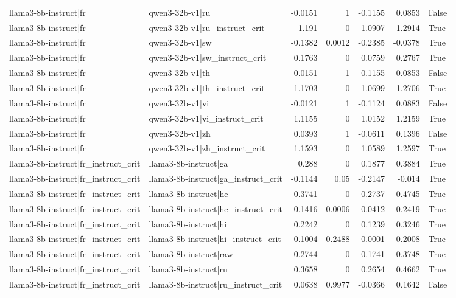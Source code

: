 \begin{table}
\begin{tabular}{l l r r r r l}
llama3-8b-instruct|fr & qwen3-32b-v1|ru & -0.0151 & 1 & -0.1155 & 0.0853 & False \\
llama3-8b-instruct|fr & qwen3-32b-v1|ru_instruct_crit & 1.191 & 0 & 1.0907 & 1.2914 & True \\
llama3-8b-instruct|fr & qwen3-32b-v1|sw & -0.1382 & 0.0012 & -0.2385 & -0.0378 & True \\
llama3-8b-instruct|fr & qwen3-32b-v1|sw_instruct_crit & 0.1763 & 0 & 0.0759 & 0.2767 & True \\
llama3-8b-instruct|fr & qwen3-32b-v1|th & -0.0151 & 1 & -0.1155 & 0.0853 & False \\
llama3-8b-instruct|fr & qwen3-32b-v1|th_instruct_crit & 1.1703 & 0 & 1.0699 & 1.2706 & True \\
llama3-8b-instruct|fr & qwen3-32b-v1|vi & -0.0121 & 1 & -0.1124 & 0.0883 & False \\
llama3-8b-instruct|fr & qwen3-32b-v1|vi_instruct_crit & 1.1155 & 0 & 1.0152 & 1.2159 & True \\
llama3-8b-instruct|fr & qwen3-32b-v1|zh & 0.0393 & 1 & -0.0611 & 0.1396 & False \\
llama3-8b-instruct|fr & qwen3-32b-v1|zh_instruct_crit & 1.1593 & 0 & 1.0589 & 1.2597 & True \\
llama3-8b-instruct|fr_instruct_crit & llama3-8b-instruct|ga & 0.288 & 0 & 0.1877 & 0.3884 & True \\
llama3-8b-instruct|fr_instruct_crit & llama3-8b-instruct|ga_instruct_crit & -0.1144 & 0.05 & -0.2147 & -0.014 & True \\
llama3-8b-instruct|fr_instruct_crit & llama3-8b-instruct|he & 0.3741 & 0 & 0.2737 & 0.4745 & True \\
llama3-8b-instruct|fr_instruct_crit & llama3-8b-instruct|he_instruct_crit & 0.1416 & 0.0006 & 0.0412 & 0.2419 & True \\
llama3-8b-instruct|fr_instruct_crit & llama3-8b-instruct|hi & 0.2242 & 0 & 0.1239 & 0.3246 & True \\
llama3-8b-instruct|fr_instruct_crit & llama3-8b-instruct|hi_instruct_crit & 0.1004 & 0.2488 & 0.0001 & 0.2008 & True \\
llama3-8b-instruct|fr_instruct_crit & llama3-8b-instruct|raw & 0.2744 & 0 & 0.1741 & 0.3748 & True \\
llama3-8b-instruct|fr_instruct_crit & llama3-8b-instruct|ru & 0.3658 & 0 & 0.2654 & 0.4662 & True \\
llama3-8b-instruct|fr_instruct_crit & llama3-8b-instruct|ru_instruct_crit & 0.0638 & 0.9977 & -0.0366 & 0.1642 & False \\

\end{tabular}
\end{table}
